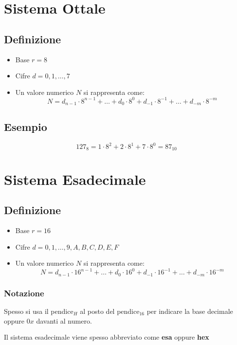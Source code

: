 \section{Sistema Ottale}
\subsection{Definizione}
\begin{itemize}
    \item Base $r=8$
    \item Cifre $d=0,1,\dots,7$
    \item Un valore numerico $N$ si rappresenta come:
    {\large
        $$
            N = d_{n-1} \cdot 8^{n-1} + \dots + d_0 \cdot 8^0 + d_{-1} \cdot 8^{-1} + \dots + d_{-m} \cdot 8^{-m}
        $$
    }
\end{itemize}

\subsection{Esempio}
{
    \Large
    $$
        127_8 = 1 \cdot 8^2 + 2 \cdot 8^1 + 7 \cdot 8^0 = 87_{10}
    $$
}

\section{Sistema Esadecimale}
\subsection{Definizione}
\begin{itemize}
    \item Base $r=16$
    \item Cifre $d=0,1,\dots,9, A, B, C, D, E, F$
    \item Un valore numerico $N$ si rappresenta come:
    {\large
        $$
            N = d_{n-1} \cdot 16^{n-1} + \dots + d_0 \cdot 16^0 + d_{-1} \cdot 16^{-1} + \dots + d_{-m} \cdot 16^{-m}
        $$
    }
\end{itemize}

\subsubsection{Notazione}
Spesso si usa il pendice$_{H}$ al posto del pendice$_{16}$ per indicare la base decimale oppure $0x$ davanti al numero.

Il sistema esadecimale viene spesso abbreviato come \textbf{esa} oppure \textbf{hex}

